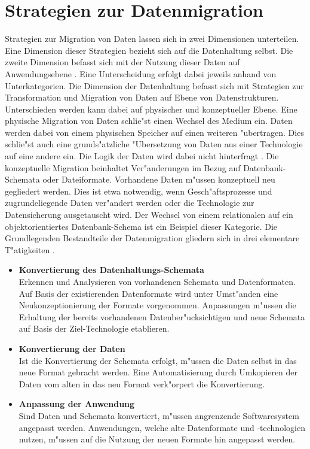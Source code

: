 \section{Strategien zur Datenmigration}

Strategien zur Migration von Daten lassen sich in zwei Dimensionen unterteilen. Eine Dimension dieser Strategien bezieht sich auf die Datenhaltung selbst. Die zweite Dimension befasst sich mit der Nutzung dieser Daten auf Anwendungsebene \citep{henrard-2002}. Eine Unterscheidung erfolgt dabei jeweils anhand von Unterkategorien.
\lb
Die Dimension der Datenhaltung befasst sich mit Strategien zur Transformation und Migration von Daten auf Ebene von Datenstrukturen. Unterschieden werden kann dabei auf physischer und konzeptueller Ebene.
\lb
Eine physische Migration von Daten schlie"st einen Wechsel des Medium ein. Daten werden dabei von einem physischen Speicher auf einen weiteren "ubertragen. Dies schlie"st auch eine grunds"atzliche "Ubersetzung von Daten aus einer Technologie auf eine andere ein. Die Logik der Daten wird dabei nicht hinterfragt \citep{henrard-2002}. 
\lb
Die konzeptuelle Migration beinhaltet Ver"anderungen im Bezug auf Datenbank-Schemata oder Dateiformate. Vorhandene Daten m"ussen konzeptuell neu gegliedert werden. Dies ist etwa notwendig, wenn Gesch"aftsprozesse und zugrundeliegende Daten ver"andert werden oder die Technologie zur Datensicherung ausgetauscht wird. Der Wechsel von einem relationalen auf ein objektorientiertes Datenbank-Schema ist ein Beispiel dieser Kategorie.
\lb
Die Grundlegenden Bestandteile der Datenmigration gliedern sich in drei elementare T"atigkeiten \citep{henrard-2002}.

\begin{itemize}
	\item \textbf{Konvertierung des Datenhaltungs-Schemata} \\
	Erkennen und Analysieren von vorhandenen Schemata und Datenformaten. Auf Basis der existierenden Datenformate wird unter Umst"anden eine Neukonzeptionierung der Formate vorgenommen. Anpassungen m"ussen die Erhaltung der bereits vorhandenen Datenber"ucksichtigen und neue Schemata auf Basis der Ziel-Technologie etablieren.
	\item \textbf{Konvertierung der Daten} \\
	Ist die Konvertierung der Schemata erfolgt, m"ussen die Daten selbst in das neue Format gebracht werden. Eine Automatisierung durch Umkopieren der Daten vom alten in das neu Format verk"orpert die Konvertierung.
	\item \textbf{Anpassung der Anwendung} \\
	Sind Daten und Schemata konvertiert, m"ussen angrenzende Softwaresystem angepasst werden. Anwendungen, welche alte Datenformate und -technologien nutzen, m"ussen auf die Nutzung der neuen Formate hin angepasst werden.
\end{itemize}

